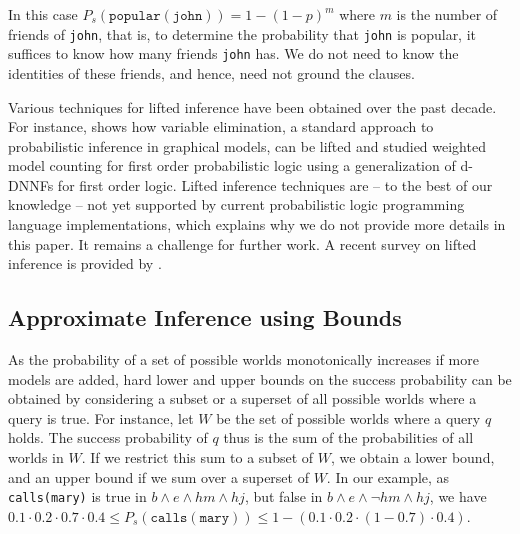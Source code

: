 \documentclass[a4paper]{article}
\begin{document}
In this case $P_s(\mathtt{popular(john)}) = 1 - (1-p)^m$ where $m$ is the number of friends of \verb|john|, that is,
to determine the probability that \verb|john| is popular, it suffices
to know how many friends \verb|john| has. We do not need to
know the identities of these friends, and hence, need not
ground the clauses.   

Various techniques for lifted inference have been 
obtained over the past decade. For instance, \cite{poole:ijcai03}
shows how variable elimination, a standard approach to probabilistic
inference in graphical models,  can be lifted
and \cite{vandenbroeck:ijcai11} studied weighted model counting for first order probabilistic logic using a generalization 
of d-DNNFs for first order logic. Lifted inference techniques are -- to the best of our knowledge -- not yet supported by current
probabilistic logic programming language implementations, which explains why we do not provide more details in this paper. 
It remains a challenge for further work. 
A recent survey on lifted inference is provided by \cite{kersting:ecai12}. 




\subsection{Approximate Inference using Bounds}\label{sec:bounds}
As the probability of a set of possible worlds monotonically increases if more
models are added, hard lower and upper bounds on the success probability
can be obtained by considering a subset or a superset of all possible
worlds where a query is true. For instance, let $W$ be the set of
possible worlds where a query $q$ holds. The success probability of
$q$ thus is the sum of the probabilities of all worlds in $W$. If we
restrict this sum to a subset of $W$, we obtain a lower bound, and an
upper bound  if
we sum over a superset of $W$. 
In our example, as \verb|calls(mary)| is true in
$b\wedge e\wedge hm\wedge hj$, but false in  $b\wedge
e\wedge\neg hm\wedge hj$, we have $0.1\cdot 0.2\cdot 0.7\cdot 0.4\leq
P_s(\mathtt{calls(mary)}) \leq 1-(0.1\cdot 0.2\cdot (1-0.7)\cdot
0.4)$. 
\end{document}
